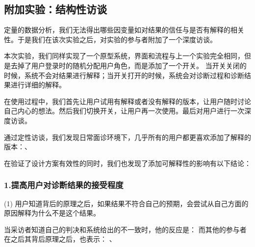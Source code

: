 





\subsection{附加实验：结构性访谈}

定量的数据分析，我们无法得出哪些因变量如对结果的信任与是否有解释的相关性。于是我们在该次实验之后，对实验的参与者附加了一个深度访谈。

本次实验，我们同样实现了一个原型系统，界面和流程与上一个实验完全相同，但是去掉了用户登录时的随机分配用户角色，而是添加了一个开关。
当开关关闭的时候，系统不会对结果进行解释；当开关打开的时候，系统会对诊断过程和诊断结果进行详细的解释。

在使用过程中，我们首先让用户试用有解释或者没有解释的版本，让用户随时讨论自己内心的想法。然后我们切换开关，让用户再一次使用。最后对用户进行一次深度访谈。

通过定性访谈，我们发现日常面诊环境下，几乎所有的用户都更喜欢添加了解释的版本：、

在验证了设计方案有效性的同时，我们也发现了添加可解释性的影响有以下结论：

\subsubsection{1.提高用户对诊断结果的接受程度}

(1) 用户知道背后的原理之后，如果结果不符合自己的预期，会尝试从自己方面的原因解释为什么不是这个结果。

当采访者知道自己的判决和系统给出的不一致时，他的反应是： 而其他的参与者在之后其背后原理之后，也表示：
、


